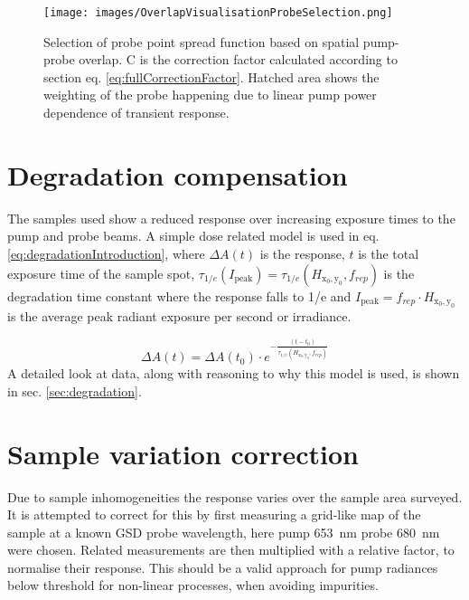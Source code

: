 \documentclass[twoside,openright,listof=numbered]{scrreprt}
\def\radiantExp{\ensuremath{H_\mathrm{x_0,y_0}}}
\begin{document}
\begin{figure}[!hb]
\centering
\texttt{[image: images/OverlapVisualisationProbeSelection.png]}
\caption[Selection of probe point spread function based on spatial pump-probe overlap.]{Selection of probe point spread function based on spatial pump-probe overlap. C is the correction factor calculated according to section eq. \ref{eq:fullCorrectionFactor}. Hatched area shows the weighting of the probe happening due to linear pump power dependence of transient response.\label{fig:overlapVisualisation}}
\end{figure}

\section{Degradation compensation}
The samples used show a reduced response over increasing exposure times to the pump and probe beams. A simple dose related model is used in eq. \ref{eq:degradationIntroduction}, where $\Delta A(t)$ is the response, $t$ is the total exposure time of the sample spot, $\tau_{1/e}\left(I_\text{peak}\right)=\tau_{1/e}\left(\radiantExp, f_{rep}\right)$ is the degradation time constant where the response falls to 1/e and $I_{\mathrm{peak}} = f_{rep}\cdot \radiantExp$ is the average peak radiant exposure per second or irradiance.

\begin{equation}\label{eq:degradationIntroduction}
\Delta A(t) = \Delta A(t_0)\cdot e^{-\frac{(t-t_0)}{\tau_{1/e}\left(\radiantExp, f_{rep}\right)}}
\end{equation}
A detailed look at data, along with reasoning to why this model is used, is shown in sec. \ref{sec:degradation}.

\section{Sample variation correction}
Due to sample inhomogeneities  the response varies over the sample area surveyed. It is attempted to correct for this by first measuring a grid-like map of the sample at a known GSD probe wavelength, here pump \qty{653}{\nano\meter} probe \qty{680}{\nano\meter} were chosen. Related measurements are then multiplied with a relative factor, to normalise their response. This should be a valid approach for pump radiances below threshold for non-linear processes, when avoiding impurities.
\end{document}
